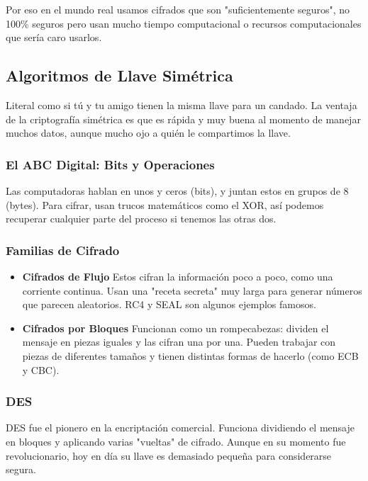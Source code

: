 \documentclass{article}
\begin{document}
            Por eso en el mundo real usamos cifrados que son "suficientemente seguros", no 100\% seguros
            pero usan mucho tiempo computacional o recursos computacionales que sería caro usarlos.

    \subsection{Algoritmos de Llave Simétrica}
            Literal como si tú y tu amigo tienen la misma llave para un candado. 
            La ventaja de la criptografía simétrica es que es rápida y muy buena al momento de
            manejar muchos datos, aunque mucho ojo a quién le compartimos la llave.
        
        \subsubsection{El ABC Digital: Bits y Operaciones}
            Las computadoras hablan en unos y ceros (bits), y juntan estos en grupos de 8 (bytes). 
            Para cifrar, usan trucos matemáticos como el XOR, así podemos recuperar cualquier parte 
            del proceso si tenemos las otras dos.
        
        \subsubsection{Familias de Cifrado}
            \begin{itemize}
                \item \textbf{Cifrados de Flujo}
                Estos cifran la información poco a poco, como una corriente continua. Usan una 
                "receta secreta" muy larga para generar números que parecen aleatorios. 
                RC4 y SEAL son algunos ejemplos famosos.
                \item \textbf{Cifrados por Bloques}
                Funcionan como un rompecabezas: dividen el mensaje en piezas iguales y las cifran 
                una por una. Pueden trabajar con piezas de diferentes tamaños y tienen distintas 
                formas de hacerlo (como ECB y CBC).
            \end{itemize}
            
    
        \subsubsection{DES}
            DES fue el pionero en la encriptación comercial. Funciona dividiendo el mensaje en 
            bloques y aplicando varias "vueltas" de cifrado. Aunque en su momento fue revolucionario, hoy en 
            día su llave es demasiado pequeña para considerarse segura.
        
\end{document}
